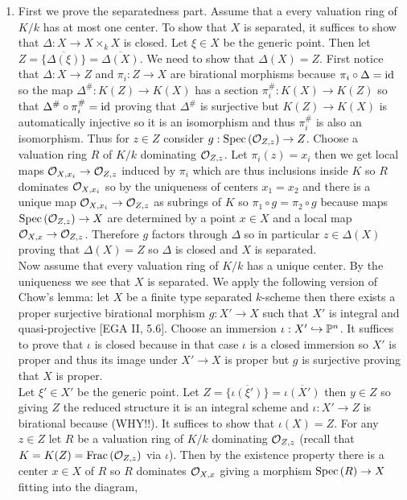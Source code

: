 \documentclass[12pt]{article}
\begin{document}
\begin{enumerate}
\item First we prove the separatedness part. Assume that a every valuation ring of $K/k$ has at most one center. To show that $X$ is separated, it suffices to show that $\Delta : X \to X \times_k X$ is closed. Let $\xi \in X$ be the generic point. Then let $Z = \overline{ \{ \Delta(\xi) \} } = \overline{\Delta(X)}$. We need to show that $\Delta(X) = Z$. First notice that $\Delta : X \to Z$ and $\pi_i : Z \to X$ are birational morphisms because $\pi_i \circ \Delta = \mathrm{id}$ so the map $\Delta^\# : K(Z) \to K(X)$ has a section $\pi_i^\# : K(X) \to K(Z)$ so that $\Delta^\# \circ \pi_i^\# = \mathrm{id}$ proving that $\Delta^\#$ is surjective but $K(Z) \to K(X)$ is automatically injective so it is an isomorphism and thus $\pi_i^\#$ is also an isomorphism. Thus for $z \in Z$ consider $g : \mathrm{Spec}\left( \mathcal{O}_{Z, z} \right) \to Z$. Choose a valuation ring $R$ of $K/k$ dominating $\mathcal{O}_{Z, z}$. Let $\pi_i(z) = x_i$ then we get local maps $\mathcal{O}_{X, x_i} \to \mathcal{O}_{Z, z}$ induced by $\pi_i$ which are thus inclusions inside $K$ so $R$ dominates $\mathcal{O}_{X, x_i}$ so by the uniqueness of centers $x_1 = x_2$ and there is a unique map $\mathcal{O}_{X, x_i} \to \mathcal{O}_{Z, z}$ as subrings of $K$ so $\pi_1 \circ g = \pi_2 \circ g$ because maps $\mathrm{Spec}\left( \mathcal{O}_{Z, z} \right) \to X$ are determined by a point $x \in X$ and a local map $\mathcal{O}_{X, x} \to \mathcal{O}_{Z, z}$. Therefore $g$ factors through $\Delta$ so in particular $z \in \Delta(X)$ proving that $\Delta(X) = Z$ so $\Delta$ is closed and $X$ is separated.
\bigskip\\
Now assume that every valuation ring of $K/k$ has a unique center. By the uniqueness we see that $X$ is separated. We apply the following version of Chow's lemma: let $X$ be a finite type separated $k$-scheme then there exists a proper surjective birational morphism $g : X' \to X$ such that $X'$ is integral and quasi-projective [EGA II, 5.6]. Choose an immersion $\iota : X' \hookrightarrow \mathbb{P}^n$. It suffices to prove that $\iota$ is closed because in that case $\iota$ is a closed immersion so $X'$ is proper and thus its image under $X' \to X$ is proper but $g$ is surjective proving that $X$ is proper.
\bigskip\\
Let $\xi' \in X'$ be the generic point. Let $Z = \overline{ \{ \iota(\xi') \} } = \overline{\iota(X')}$ then $y \in Z$ so giving $Z$ the reduced structure it is an integral scheme and $\iota : X' \to Z$ is birational because (WHY!!). It suffices to show that $\iota(X) = Z$. For any $z \in Z$ let $R$ be a valuation ring of $K/k$ dominating $\mathcal{O}_{Z, z}$ (recall that $K = K(Z) = \mathrm{Frac}\left(\mathcal{O}_{Z, z}\right)$ via $\iota$). Then by the existence property there is a center $x \in X$ of $R$ so $R$ dominates $\mathcal{O}_{X, x}$ giving a morphism $\mathrm{Spec}\left( R \right) \to X$ fitting into the diagram,

\end{enumerate}
\end{document}
